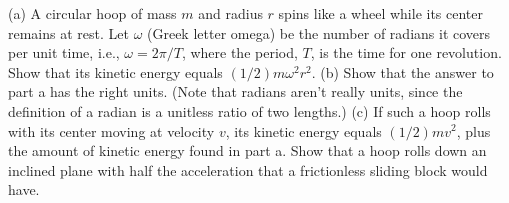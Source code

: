(a) A circular hoop of mass $m$ and radius $r$ spins like a
        wheel while its center remains at rest.  Let $\omega$ (Greek letter omega) be 
        the number of radians it covers per unit time, i.e., $\omega=2\pi/T$, 
        where the
        period, $T$, is the time for one revolution.
        Show that its kinetic
        energy equals $(1/2)m\omega^2r^2$. \hwendpart
        (b) Show that the answer to part a
        has the right units. (Note that radians aren't really units, since the definition
        of a radian is a unitless ratio of two lengths.)\hwendpart
        (c) If such a hoop rolls with its
        center moving at velocity $v$, its kinetic energy
        equals $(1/2)mv^2$, plus the amount of kinetic energy found in
        part a. Show that a hoop rolls down
        an inclined plane with half the acceleration that a
        frictionless sliding block would have.
